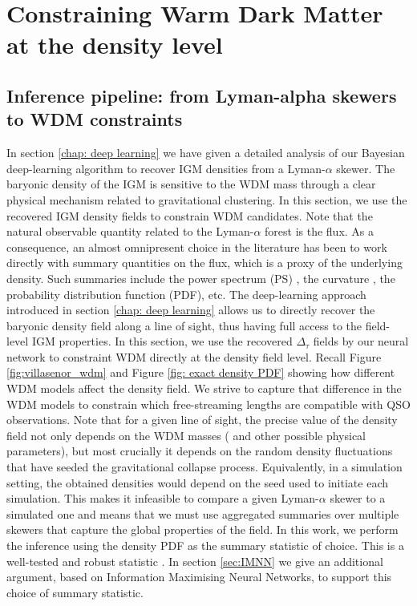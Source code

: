 \chapter{Constraining Warm Dark Matter at the density level}\label{sec: inference pipeline}


\section{Inference pipeline: from Lyman-alpha skewers to WDM constraints}\label{sec: inference algo}

In section \ref{chap: deep learning} we have given a detailed analysis of our Bayesian deep-learning algorithm to recover IGM densities from a Lyman-$\alpha$ skewer. The baryonic density of the IGM is sensitive to the WDM mass through a clear physical mechanism related to gravitational clustering. In this section, we use the recovered IGM density fields to constrain WDM candidates. Note that the natural observable quantity related to the Lyman-$\alpha$ forest is the flux. As a consequence, an almost omnipresent choice in the literature has been to work directly with summary quantities on the flux, which is a proxy of the underlying density. Such summaries include the power spectrum (PS) \cite{Villasenor_2023}, the curvature \cite{Becker_2010}, the probability distribution function (PDF), etc. The deep-learning approach introduced in section \ref{chap: deep learning} allows us to directly recover the baryonic density field along a line of sight, thus having full access to the field-level IGM properties. In this section, we use the recovered $\Delta_\tau$ fields by our neural network to constraint WDM directly at the density field level. Recall Figure \ref{fig:villasenor_wdm} and Figure \ref{fig: exact density PDF} showing how different WDM models affect the density field. We strive to capture that difference in the WDM models to constrain which free-streaming lengths are compatible with QSO observations. Note that for a given line of sight, the precise value of the density field not only depends on the WDM masses ( and other possible physical parameters), but most crucially it depends on the random density fluctuations that have seeded the gravitational collapse process. Equivalently, in a simulation setting, the obtained densities would depend on the seed used to initiate each simulation. This makes it infeasible to compare a given Lyman-$\alpha$ skewer to a simulated one and means that we must use aggregated summaries over multiple skewers that capture the global properties of the field. In this work, we perform the inference using the density PDF as the summary statistic of choice. This is a well-tested and robust statistic \cite{Gaikwad_2021}. In section \ref{sec:IMNN} we give an additional argument, based on Information Maximising Neural Networks, to support this choice of summary statistic.



